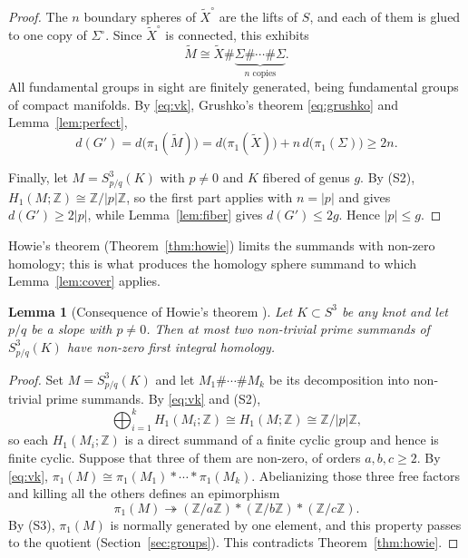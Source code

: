 \documentclass[12pt]{article}
\newcommand{\Z}{\mathbb Z}
\newcommand{\Surg}[2]{S^3_{#1}(#2)}
\newcommand{\rk}{d}
\newtheorem{lemma}[theorem]{Lemma}
\theoremstyle{definition}
\theoremstyle{remark}
\begin{document}
\begin{proof}
The \(n\) boundary spheres of \(\widetilde X^\circ\) are the lifts of
\(S\), and each of them is glued to one copy of \(\Sigma^\circ\). Since
\(\widetilde X^\circ\) is connected, this exhibits
\begin{equation}\label{eq:cover-sum}
 \widetilde M\cong
 \widetilde X\#\underbrace{\Sigma\#\cdots\#\Sigma}_{n\text{ copies}}.
\end{equation}
All fundamental groups in sight are finitely generated, being
fundamental groups of compact manifolds. By \eqref{eq:vk}, Grushko's
theorem \eqref{eq:grushko} and Lemma~\ref{lem:perfect},
\[
 \rk(G')=\rk\bigl(\pi_1(\widetilde M)\bigr)
 =\rk\bigl(\pi_1(\widetilde X)\bigr)+n\,\rk\bigl(\pi_1(\Sigma)\bigr)
 \geq 2n.
\]

Finally, let \(M=\Surg{p/q}{K}\) with \(p\neq0\) and \(K\) fibered of
genus \(g\). By (S2), \(H_1(M;\Z)\cong\Z/|p|\Z\), so the first part applies
with \(n=|p|\) and gives \(\rk(G')\geq2|p|\), while
Lemma~\ref{lem:fiber} gives \(\rk(G')\leq2g\). Hence \(|p|\leq g\).
\end{proof}

Howie's theorem (Theorem~\ref{thm:howie}) limits the summands with
non-zero homology; this is what produces the homology sphere summand to
which Lemma~\ref{lem:cover} applies.

\begin{lemma}[Consequence of Howie's theorem {\cite{Howie2002}}]\label{lem:howie}
Let \(K\subset S^3\) be any knot and let \(p/q\) be a slope with
\(p\neq0\). Then at most two non-trivial prime summands of
\(\Surg{p/q}{K}\) have non-zero first integral homology.
\end{lemma}

\begin{proof}
Set \(M=\Surg{p/q}{K}\) and let \(M_1\#\cdots\#M_k\) be its decomposition
into non-trivial prime summands. By \eqref{eq:vk} and (S2),
\[
 \bigoplus_{i=1}^k H_1(M_i;\Z)\cong H_1(M;\Z)\cong\Z/|p|\Z,
\]
so each \(H_1(M_i;\Z)\) is a direct summand of a finite cyclic group and
hence is finite cyclic. Suppose that three of them are non-zero, of
orders \(a,b,c\geq2\). By \eqref{eq:vk},
\(\pi_1(M)\cong\pi_1(M_1)*\cdots*\pi_1(M_k)\). Abelianizing those three
free factors and killing all the others defines an epimorphism
\[
 \pi_1(M)\twoheadrightarrow(\Z/a\Z)*(\Z/b\Z)*(\Z/c\Z).
\]
By (S3), \(\pi_1(M)\) is normally generated by one element, and this
property passes to the quotient (Section~\ref{sec:groups}). This
contradicts Theorem~\ref{thm:howie}.
\end{proof}
\end{document}
